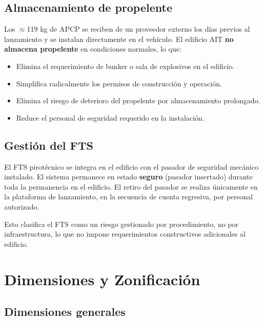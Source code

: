 \documentclass[11pt, a4paper]{article}
\begin{document}
\subsection{Almacenamiento de propelente}

Los $\approx$119 kg de APCP se reciben de un proveedor externo los días previos al lanzamiento y se instalan directamente en el vehículo. El edificio AIT \textbf{no almacena propelente} en condiciones normales, lo que:

\begin{itemize}[leftmargin=1.5cm, itemsep=3pt]
  \item Elimina el requerimiento de bunker o sala de explosivos en el edificio.
  \item Simplifica radicalmente los permisos de construcción y operación.
  \item Elimina el riesgo de deterioro del propelente por almacenamiento prolongado.
  \item Reduce el personal de seguridad requerido en la instalación.
\end{itemize}

\subsection{Gestión del FTS}

El FTS pirotécnico se integra en el edificio con el pasador de seguridad mecánico instalado. El sistema permanece en estado \textbf{seguro} (pasador insertado) durante toda la permanencia en el edificio. El retiro del pasador se realiza únicamente en la plataforma de lanzamiento, en la secuencia de cuenta regresiva, por personal autorizado.

Esto clasifica el FTS como un riesgo gestionado por procedimiento, no por infraestructura, lo que no impone requerimientos constructivos adicionales al edificio.

\section{Dimensiones y Zonificación}

\subsection{Dimensiones generales}
\end{document}
